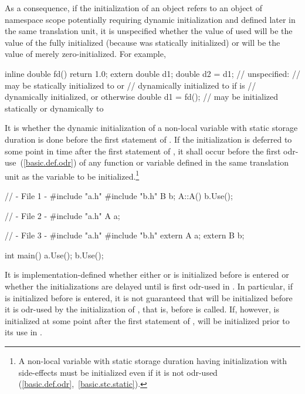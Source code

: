 \enternote As a consequence, if the initialization of an object  refers to an
object  of namespace scope potentially requiring dynamic initialization and defined
later in the same translation unit, it is unspecified whether the value of  used
will be the value of the fully initialized  (because  was statically
initialized) or will be the value of  merely zero-initialized. For example,

\begin{codeblock}
inline double fd() { return 1.0; }
extern double d1;
double d2 = d1;     // unspecified:
                    // may be statically initialized to  or
                    // dynamically initialized to  if  is
                    // dynamically initialized, or  otherwise
double d1 = fd();   // may be initialized statically or dynamically to 
\end{codeblock}
\exitnote

\pnum
{}%
It is  whether the
dynamic initialization of a non-local variable with static storage duration is
done before the first statement of . If the initialization is deferred to
some point in time after the first statement of , it shall occur before the
first odr-use~(\ref{basic.def.odr}) of any function or variable
defined in the same translation unit as the variable
to be initialized.\footnote{A non-local variable with static storage duration
having initialization
with side-effects must be initialized even if it is not
odr-used (\ref{basic.def.odr},~\ref{basic.stc.static}).}
\enterexample 

\begin{codeblock}
// - File 1 -
#include "a.h"
#include "b.h"
B b;
A::A(){
  b.Use();
}

// - File 2 -
#include "a.h"
A a;

// - File 3 -
#include "a.h"
#include "b.h"
extern A a;
extern B b;

int main() {
  a.Use();
  b.Use();
}
\end{codeblock}

It is implementation-defined whether either  or  is
initialized before  is entered or whether the
initializations are delayed until  is first odr-used in
. In particular, if  is initialized before
 is entered, it is not guaranteed that  will be
initialized before it is odr-used by the initialization of , that
is, before  is called. If, however,  is initialized
at some point after the first statement of ,  will
be initialized prior to its use in . \exitexample

